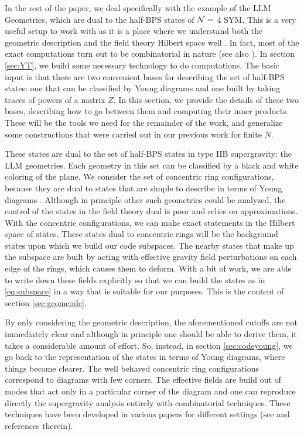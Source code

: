 \documentclass[12pt,nofootinbib, longbibliography]{revtex4-1}
\begin{document}
In the rest of the paper, we deal specifically with the example of the LLM Geometries, which are dual to the half-BPS states of $\cal{N}=$ 4 SYM. This is a very useful  setup to work with as it is a place where we understand both the geometric description \cite{Lin:2004nb} and the field theory Hilbert space well \cite{Corley:2001zk,Berenstein:2004kk}. In fact, most of the exact  computations turn out to be  combinatorial in nature \cite{Berenstein:2017abm} (see also \cite{Lin:2017dnz}). In section \ref{sec:YT}, we build some necessary technology to do computations. The basic input is that there are two convenient bases for describing the set of half-BPS states: one that can be classified by Young diagrams and one built by taking traces of powers of a matrix $Z$. In this section, we provide the details of these two bases, describing how to go between them and computing their inner products. These will be the tools we need for the remainder of the work, and generalize some constructions that were carried out in our previous work \cite{Berenstein:2017abm} for finite $N$. 

These states are dual to the set of half-BPS states in type IIB supergravity: the LLM geometries. Each geometry in this set can be classified by a black and white coloring of the plane. We consider the set of concentric ring configurations, because they are dual to states that are simple to describe in terms of Young diagrams \cite{Lin:2004nb,Mosaffa:2006qk}. Although in principle other such geometries could be analyzed, the control of the states in the field theory dual is  poor and relies on approximations. With the concentric configurations, we can make exact statements in the Hilbert space of states.
 These states dual to concentric rings will be the background states upon which we build our code subspaces. The nearby states that make up the subspace are built by acting with effective gravity field perturbations on each edge of the rings, which causes them to deform. With a bit of work, we are able to write down these fields explicitly so that we can build the states as in \eqref{eq:subspace} in a way that is suitable for our purposes. This is the content of section \ref{sec:geomcode}.

By only considering the geometric description, the aforementioned cutoffs are not immediately clear and although in principle one should  be able to derive them, it takes a considerable amount of effort. So, instead, in section \ref{sec:codeyoung}, we go back to the representation of the states in terms of Young diagrams, where things become clearer. The well behaved concentric ring configurations correspond to diagrams with few corners. The effective fields are build out of modes that act only in a particular corner of the diagram and one can reproduce directly the supergravity analysis entirely with combinatorial techniques. These techniques have been developed in various papers for different settings (see \cite{Kristjansen:2002bb,Koch:2008ah, Berenstein:2013md, Berenstein:2017abm,Lin:2017dnz} and references therein).
\end{document}
